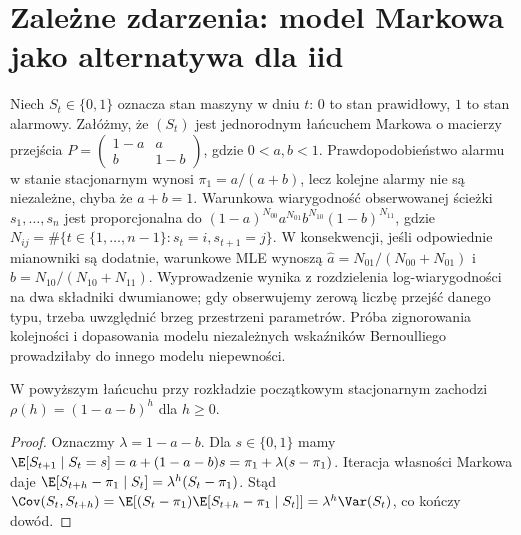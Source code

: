 \section{Zależne zdarzenia: model Markowa jako alternatywa dla iid}
\begin{przyklad}
Niech $S_t\in\{0,1\}$ oznacza stan maszyny w dniu $t$:
$0$ to stan prawidłowy, $1$ to stan alarmowy. Załóżmy,
że $(S_t)$ jest jednorodnym łańcuchem Markowa o macierzy
przejścia
$P=\begin{pmatrix}1-a&a\\ b&1-b\end{pmatrix}$,
gdzie $0<a,b<1$. Prawdopodobieństwo alarmu w stanie
stacjonarnym wynosi $\pi_1=a/(a+b)$, lecz kolejne
alarmy nie są niezależne, chyba że $a+b=1$.
Warunkowa wiarygodność obserwowanej ścieżki
$s_1,\ldots,s_n$ jest proporcjonalna do
$(1-a)^{N_{00}}a^{N_{01}}b^{N_{10}}(1-b)^{N_{11}}$,
gdzie $N_{ij}=\#\{t\in\{1,\ldots,n-1\}:s_t=i,s_{t+1}=j\}$.
W konsekwencji, jeśli odpowiednie mianowniki są dodatnie,
warunkowe MLE wynoszą
$\widehat a=N_{01}/(N_{00}+N_{01})$ i
$\widehat b=N_{10}/(N_{10}+N_{11})$.
Wyprowadzenie wynika z rozdzielenia log-wiarygodności
na dwa składniki dwumianowe; gdy obserwujemy zerową
liczbę przejść danego typu, trzeba uwzględnić brzeg
przestrzeni parametrów. Próba zignorowania kolejności
i dopasowania modelu niezależnych wskaźników Bernoulliego
prowadziłaby do innego modelu niepewności.
\end{przyklad}

\begin{stwierdzenie}
\label{prop:markov-corr}
W powyższym łańcuchu przy rozkładzie początkowym
stacjonarnym zachodzi
$\rho(h)=(1-a-b)^h$ dla $h\ge0$.
\end{stwierdzenie}
\begin{proof}
Oznaczmy $\lambda=1-a-b$.
Dla $s\in\{0,1\}$ mamy
$\E[S_{t+1}\mid S_t=s]=a+(1-a-b)s
=\pi_1+\lambda(s-\pi_1)$.
Iteracja własności Markowa daje
$\E[S_{t+h}-\pi_1\mid S_t]=\lambda^h(S_t-\pi_1)$.
Stąd
$\Cov(S_t,S_{t+h})=
\E[(S_t-\pi_1)\E[S_{t+h}-\pi_1\mid S_t]]
=\lambda^h\Var(S_t)$, co kończy dowód.
\end{proof}

